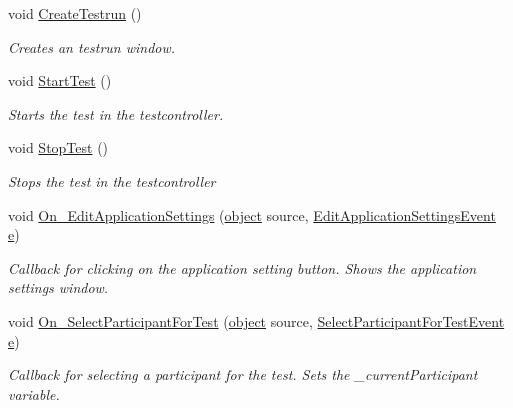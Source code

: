 \begin{DoxyCompactItemize}
void \hyperlink{class_web_analyzer_1_1_controller_1_1_main_controller_a89558728bf22eec76ec4ff3ca0660490}{Create\+Testrun} ()
\begin{DoxyCompactList}\small\item\em Creates an testrun window. \end{DoxyCompactList}\item 
void \hyperlink{class_web_analyzer_1_1_controller_1_1_main_controller_a15dde2aa8b4f85e01fdfecf48483bbf8}{Start\+Test} ()
\begin{DoxyCompactList}\small\item\em Starts the test in the testcontroller. \end{DoxyCompactList}\item 
void \hyperlink{class_web_analyzer_1_1_controller_1_1_main_controller_ac75ad84f0191902e27a711efd325c648}{Stop\+Test} ()
\begin{DoxyCompactList}\small\item\em Stops the test in the testcontroller \end{DoxyCompactList}\item 
void \hyperlink{class_web_analyzer_1_1_controller_1_1_main_controller_a0a28f10eb1aa2b814224a31a8a801054}{On\+\_\+\+Edit\+Application\+Settings} (\hyperlink{_u_i_2_h_t_m_l_resources_2js_2lib_2underscore_8min_8js_aae18b7515bb2bc4137586506e7c0c903}{object} source, \hyperlink{class_web_analyzer_1_1_events_1_1_edit_application_settings_event}{Edit\+Application\+Settings\+Event} \hyperlink{_u_i_2_h_t_m_l_resources_2js_2lib_2bootstrap_8min_8js_ab5902775854a8b8440bcd25e0fe1c120}{e})
\begin{DoxyCompactList}\small\item\em Callback for clicking on the application setting button. Shows the application settings window. \end{DoxyCompactList}\item 
void \hyperlink{class_web_analyzer_1_1_controller_1_1_main_controller_ae8eae4c1e6dda888f7231e39aaabba3c}{On\+\_\+\+Select\+Participant\+For\+Test} (\hyperlink{_u_i_2_h_t_m_l_resources_2js_2lib_2underscore_8min_8js_aae18b7515bb2bc4137586506e7c0c903}{object} source, \hyperlink{class_web_analyzer_1_1_events_1_1_select_participant_for_test_event}{Select\+Participant\+For\+Test\+Event} \hyperlink{_u_i_2_h_t_m_l_resources_2js_2lib_2bootstrap_8min_8js_ab5902775854a8b8440bcd25e0fe1c120}{e})
\begin{DoxyCompactList}\small\item\em Callback for selecting a participant for the test. Sets the \+\_\+current\+Participant variable. \end{DoxyCompactList}\item 

\end{DoxyCompactItemize}
